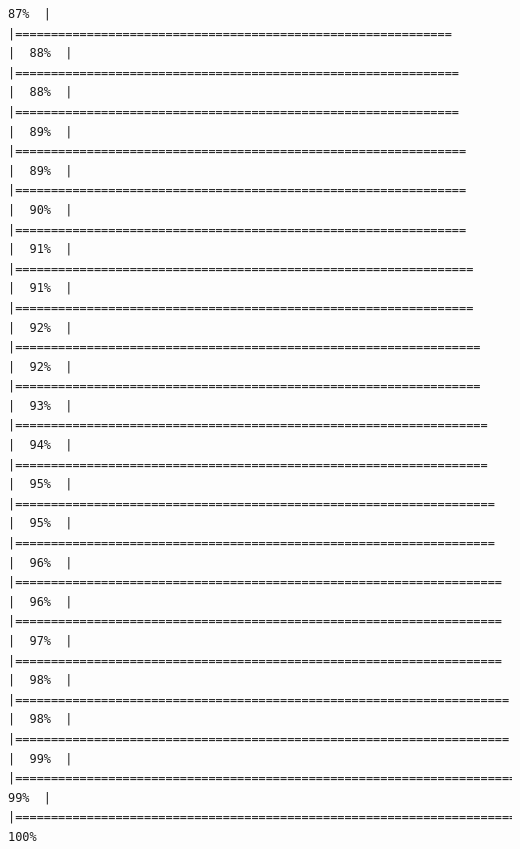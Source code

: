 \documentclass[
  english,
  man,a4paper,mask,floatsintext]{apa6}
\begin{document}
\begin{verbatim}
87%  |                                                                              |=============================================================         |  88%  |                                                                              |==============================================================        |  88%  |                                                                              |==============================================================        |  89%  |                                                                              |===============================================================       |  89%  |                                                                              |===============================================================       |  90%  |                                                                              |===============================================================       |  91%  |                                                                              |================================================================      |  91%  |                                                                              |================================================================      |  92%  |                                                                              |=================================================================     |  92%  |                                                                              |=================================================================     |  93%  |                                                                              |==================================================================    |  94%  |                                                                              |==================================================================    |  95%  |                                                                              |===================================================================   |  95%  |                                                                              |===================================================================   |  96%  |                                                                              |====================================================================  |  96%  |                                                                              |====================================================================  |  97%  |                                                                              |====================================================================  |  98%  |                                                                              |===================================================================== |  98%  |                                                                              |===================================================================== |  99%  |                                                                              |======================================================================|  99%  |                                                                              |======================================================================| 100%

\end{verbatim}
\end{document}
